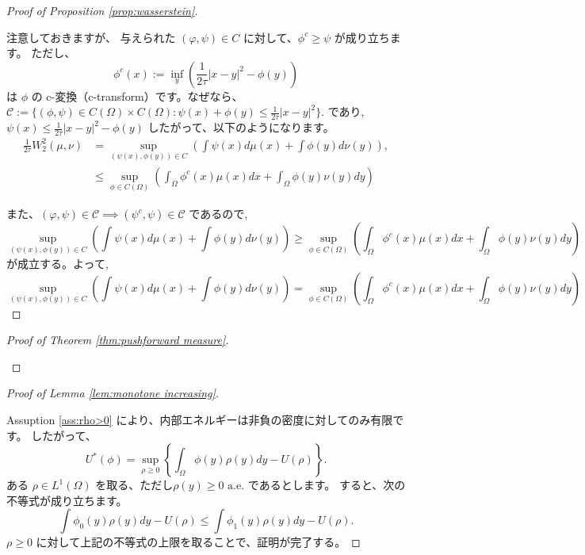 \documentclass{jsarticle}
\theoremstyle{definition}
\begin{document}
\begin{proof}[Proof of Proposition \ref{prop:wasserstein}]
    \hypertarget{proof:prop:wasserstein}{}
    \quad\par
    注意しておきますが、
    {\color{teal}
    与えられた \((\varphi, \psi) \in C\) に対して、{\color{red}\(\phi^c \geq \psi\) }が成り立ちます。
    }
    ただし、
    \[
    \phi^c(x) := \inf_y \left( \frac{1}{2\tau}|x-y|^2 - \phi(y)\right)
    \]
    は \(\phi\) の c-変換（c-transform）です。なぜなら、
    $
        \mathcal{C}  := \{(\phi, \psi) \in C(\Omega) \times C(\Omega) : \psi(x) + \phi(y) \leq \frac{1}{2 \tau} |x - y|^2 \}. 
    $
    であり,
    $
    \psi(x) \le \frac{1}{2\tau}|x-y|^2 - \phi(y)
    $
    したがって、以下のようになります。
    \begin{align*}
        \frac{1}{2 \tau}W_2^2(\mu, \nu) &= \sup_{(\psi(x), \phi(y)) \in C}  \left( \int \psi(x) d\mu(x) + \int \phi(y) d\nu(y) \right),\\
                                        &\leq \sup_{\phi \in C(\Omega)} \left( \int_{\Omega} \phi^c(x) \mu(x)dx + \int_{\Omega} \phi(y) \nu(y)dy \right) 
    \end{align*}

    また、$(\varphi, \psi) \in \mathcal{C} \implies (\psi^c, \psi) \in \mathcal{C}$
    であるので,
    \[
        \sup_{(\psi(x), \phi(y)) \in C}  \left( \int \psi(x) d\mu(x) + \int \phi(y) d\nu(y) \right) \geq \sup_{\phi \in C(\Omega)} \left( \int_{\Omega} \phi^c(x) \mu(x)dx + \int_{\Omega} \phi(y) \nu(y)dy \right) 
    \]
    が成立する。よって,
    \[
        \sup_{(\psi(x), \phi(y)) \in C}  \left( \int \psi(x) d\mu(x) + \int \phi(y) d\nu(y) \right) = \sup_{\phi \in C(\Omega)} \left( \int_{\Omega} \phi^c(x) \mu(x)dx + \int_{\Omega} \phi(y) \nu(y)dy \right) 
    \]
\end{proof}

\begin{proof}[Proof of Theorem \ref{thm:pushforward measure}]
    \hypertarget{proof:thm:pushforward measure}{}
    
\end{proof}

\begin{proof}[Proof of Lemma \ref{lem:monotone increasing}]
    \hypertarget{proof:lem:monotone increasing}{}
    \quad\par
    Assuption \ref{ass:rho>0} により、内部エネルギーは非負の密度に対してのみ有限です。
    したがって、
    $$
        U^*(\phi) = \sup_{\rho \geq 0} \left\{ \int_\Omega \phi(y) \rho(y) dy - U(\rho) \right\}.
    $$
    ある $\rho \in L^1(\Omega)$ を取る、ただし$\rho(y) \geq 0 \text{ a.e.}$ であるとします。
    すると、次の不等式が成り立ちます。
    $$
        \int \phi_0(y) \rho(y) dy - U(\rho) \leq \int \phi_1(y) \rho(y) dy - U(\rho).
    $$
    $\rho \geq 0$ に対して上記の不等式の上限を取ることで、証明が完了する。
    
\end{proof}
\end{document}
